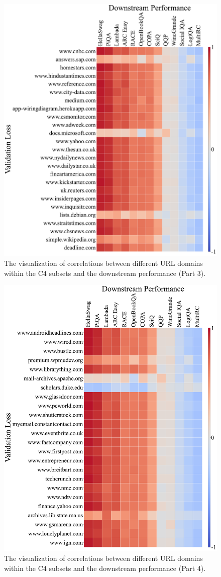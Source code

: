 \begin{figure}[htbp]
    \centering
    \includegraphics[height=0.9\textwidth]{figures/Domain_and_Task_c4100_full_3.pdf}
    \caption{The visualization of correlations between different URL domains within the C4 subsets and the downstream performance (Part 3).}
    \label{fig:c4100-full-3}
\end{figure}

\begin{figure}[htbp]
    \centering
    \includegraphics[height=0.9\textwidth]{figures/Domain_and_Task_c4100_full_4.pdf}
    \caption{The visualization of correlations between different URL domains within the C4 subsets and the downstream performance (Part 4).}
    \label{fig:c4100-full-4}
\end{figure}


\clearpage